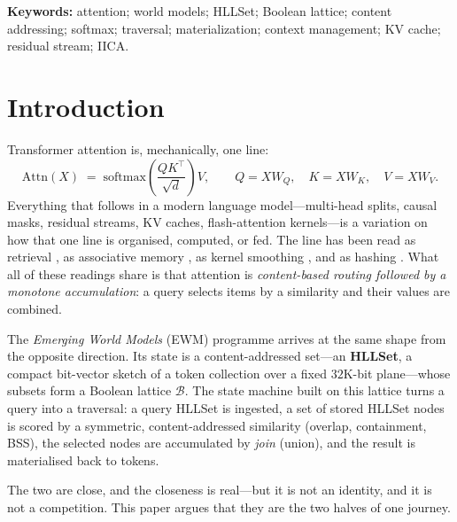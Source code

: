 \documentclass[11pt,a4paper]{article}
\theoremstyle{remark}
\newcommand{\Lat}{\ensuremath{\mathcal{B}}}            %
\newcommand{\Attn}{\ensuremath{\mathrm{Attn}}}          %
\begin{document}
\noindent\textbf{Keywords:} attention; world models; HLLSet; Boolean lattice;
content addressing; softmax; traversal; materialization; context management;
KV cache; residual stream; IICA.

\section{Introduction}
\label{sec:intro}

Transformer attention \cite{vaswani2017} is, mechanically, one line:
\[
  \Attn(X) \;=\; \mathrm{softmax}\!\left(\frac{QK^{\top}}{\sqrt{d}}\right) V,
  \qquad Q=XW_Q,\quad K=XW_K,\quad V=XW_V .
\]
Everything that follows in a modern language model---multi-head splits,
causal masks, residual streams, KV caches, flash-attention kernels---is a
variation on how that one line is organised, computed, or fed. The line has
been read as retrieval \cite{lewis2020}, as associative memory
\cite{ramsauer2020}, as kernel smoothing \cite{choromanski2021}, and as
hashing \cite{kitaev2020}. What all of these readings share is that attention
is \emph{content-based routing followed by a monotone accumulation}: a query
selects items by a similarity and their values are combined.

The \emph{Emerging World Models} (EWM) programme \cite{ewm2026,companion2026}
arrives at the same shape from the opposite direction. Its state is a
content-addressed set---an \textbf{HLLSet}, a compact bit-vector sketch of a
token collection over a fixed $32$K-bit plane---whose subsets form a Boolean
lattice $\Lat$. The state machine built on this lattice \cite{state2026} turns
a query into a traversal: a query HLLSet is ingested, a set of stored HLLSet
nodes is scored by a symmetric, content-addressed similarity (overlap,
containment, BSS), the selected nodes are accumulated by \emph{join} (union),
and the result is materialised back to tokens.

The two are close, and the closeness is real---but it is not an identity, and it
is not a competition. This paper argues that they are the two halves of one
journey.
\end{document}

